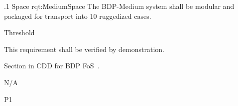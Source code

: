 
\ONERQMTVKSA
{\RqtNumberBase.1}
{Space}
{rqt:MediumSpace}
{The BDP-Medium system shall be modular and packaged for transport into 10 ruggedized cases.}
{
	\item [Phase 1] Threshold
}
{This requirement shall be verified by demonstration.}
{
\item [5.5.8] Section in CDD for BDP FoS~\cite{ref__BDP_FOS_CDD}.
}
{
	\item N/A
}
{P1}

